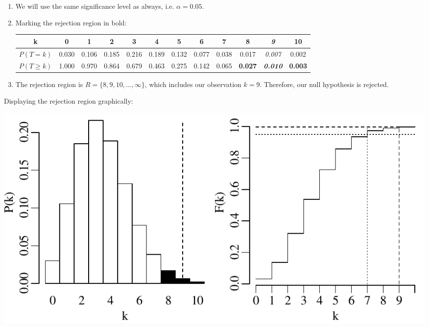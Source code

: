 \begin{enumerate}
\item We will use the same significance level as always,
  i.e. $\alpha=0.05$.

\item Marking the rejection region in bold:

  \begin{tabular}{c@{~}c@{~}c@{~}c@{~}c@{~}c@{~}c@{~}c@{~}c@{~}c@{~}c@{~}c}
    k & 0 & 1 & 2 & 3 & 4 & 5 & 6 & 7 & \textbf{8} &
    \textbf{\textit{9}} & \textbf{10} \\ \hline
    $P(T=k)$ & 0.030 & 0.106 & 0.185 & 0.216 & 0.189 &
    0.132 & 0.077 & 0.038 & 0.017 & \textit{0.007} & 0.002 \\
    $P({T}\geq{k})$ & 1.000 & 0.970 & 0.864 & 0.679 & 0.463 &
    0.275 & 0.142 & 0.065 & \textbf{0.027} & \textbf{\textit{0.010}} &
    \textbf{0.003} \\
  \end{tabular}

\item\label{it:poisl351sided} The rejection region is $R =
  \{8,9,10,\ldots,\infty\}$, which includes our observation
  $k=9$. Therefore, our null hypothesis is rejected.

\end{enumerate}

Displaying the rejection region graphically:

\noindent\begin{minipage}[t][][b]{.6\textwidth}
  \includegraphics[width=\textwidth]{../figures/poishyp.pdf}\medskip
\end{minipage}
\begin{minipage}[t][][t]{.4\textwidth}
  \label{fig:poishyp}
\end{minipage}

